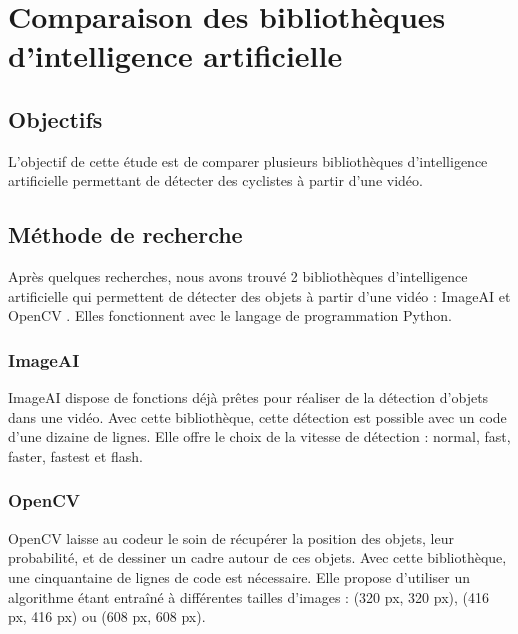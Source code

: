 \section{Comparaison des bibliothèques d'intelligence artificielle}
\label{sec:comparaisonIA}

\subsection{Objectifs}
\label{sec:comparaisonIA:objectifs}

L'objectif de cette étude est de comparer plusieurs bibliothèques d'intelligence artificielle
permettant de détecter des cyclistes à partir d'une vidéo.

\subsection{Méthode de recherche}
\label{sec:comparaisonIA:methode_recherche}

Après quelques recherches, nous avons trouvé 2 bibliothèques d'intelligence artificielle
qui permettent de détecter des objets à partir d'une vidéo : ImageAI et OpenCV \cite{ImageAI_site_officiel, OpenCV_site_officiel}.
Elles fonctionnent avec le langage de programmation Python.

\subsubsection{ImageAI}
\label{sec:comparaisonIA:methode_recherche:imageAI}

ImageAI dispose de fonctions déjà prêtes pour réaliser de la détection d'objets dans une vidéo.
Avec cette bibliothèque, cette détection est possible avec un code d'une dizaine de lignes.
Elle offre le choix de la vitesse de détection : normal, fast, faster, fastest et flash.

\subsubsection{OpenCV}
\label{sec:comparaisonIA:methode_recherche:openCV}

OpenCV laisse au codeur le soin de récupérer la position des objets, leur probabilité, et de dessiner un cadre autour de ces objets.
Avec cette bibliothèque, une cinquantaine de lignes de code est nécessaire.
Elle propose d'utiliser un algorithme étant entraîné à différentes tailles d'images : (320 px, 320 px), (416 px, 416 px) ou (608 px, 608 px).


